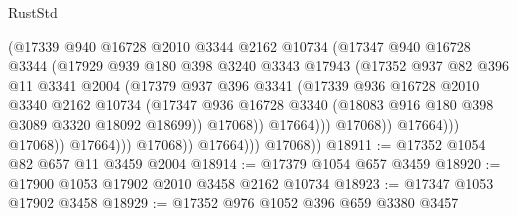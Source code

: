 \begin{lexlean}{RustStd}
\begin{coremodule}
                                    (@17339
                                      @940
                                      @16728
                                      @2010
                                      @3344
                                      @2162
                                      @10734
                                      (@17347
                                        @940
                                        @16728
                                        @3344
                                        (@17929
                                          @939
                                          @180
                                          @398
                                          @3240
                                          @3343
                                          @17943
                                          (@17352
                                            @937
                                            @82
                                            @396
                                            @11
                                            @3341
                                            @2004
                                            (@17379
                                              @937
                                              @396
                                              @3341
                                              (@17339
                                                @936
                                                @16728
                                                @2010
                                                @3340
                                                @2162
                                                @10734
                                                (@17347
                                                  @936
                                                  @16728
                                                  @3340
                                                  (@18083 @916 @180 @398 @3089 @3320 @18092 @18699))
                                                @17068))
                                            @17664)))
                                      @17068))
                                  @17664)))
                            @17068))
                        @17664)))
                  @17068))
              @17664)))
        @17068))
@18911 := @17352 @1054 @82 @657 @11 @3459 @2004
@18914 := @17379 @1054 @657 @3459
@18920 := @17900 @1053 @17902 @2010 @3458 @2162 @10734
@18923 := @17347 @1053 @17902 @3458
@18929 := @17352 @976 @1052 @396 @659 @3380 @3457

\end{coremodule}
\end{lexlean}
